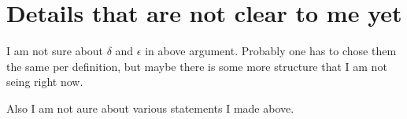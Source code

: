 \documentclass[11pt,a4paper]{scrartcl}
\begin{document}
\section{Details that are not clear to me yet}
I am not sure about $\delta$ and $\epsilon$ in above argument.
Probably one has to chose them the same per definition, but maybe there is some more structure that
I am not seing right now.

Also I am not aure about various statements I made above.
\end{document}
